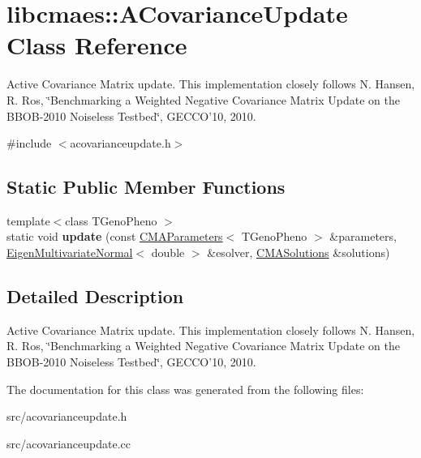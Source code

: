 \hypertarget{classlibcmaes_1_1ACovarianceUpdate}{\section{libcmaes\-:\-:A\-Covariance\-Update Class Reference}
\label{classlibcmaes_1_1ACovarianceUpdate}
}


Active Covariance Matrix update. This implementation closely follows N. Hansen, R. Ros, \char`\"{}\-Benchmarking a Weighted Negative Covariance Matrix 
                           Update on the B\-B\-O\-B-\/2010 Noiseless Testbed\char`\"{}, G\-E\-C\-C\-O'10, 2010.  




{\ttfamily \#include $<$acovarianceupdate.\-h$>$}

\subsection*{Static Public Member Functions}
\begin{DoxyCompactItemize}
\item 
\hypertarget{classlibcmaes_1_1ACovarianceUpdate_a32ad73806788c6d67da8cc908baec6c4}{{\footnotesize template$<$class T\-Geno\-Pheno $>$ }\\static void {\bfseries update} (const \hyperlink{classlibcmaes_1_1CMAParameters}{C\-M\-A\-Parameters}$<$ T\-Geno\-Pheno $>$ \&parameters, \hyperlink{classEigen_1_1EigenMultivariateNormal}{Eigen\-Multivariate\-Normal}$<$ double $>$ \&esolver, \hyperlink{classlibcmaes_1_1CMASolutions}{C\-M\-A\-Solutions} \&solutions)}\label{classlibcmaes_1_1ACovarianceUpdate_a32ad73806788c6d67da8cc908baec6c4}

\end{DoxyCompactItemize}


\subsection{Detailed Description}
Active Covariance Matrix update. This implementation closely follows N. Hansen, R. Ros, \char`\"{}\-Benchmarking a Weighted Negative Covariance Matrix 
                           Update on the B\-B\-O\-B-\/2010 Noiseless Testbed\char`\"{}, G\-E\-C\-C\-O'10, 2010. 

The documentation for this class was generated from the following files\-:\begin{DoxyCompactItemize}
\item 
src/acovarianceupdate.\-h\item 
src/acovarianceupdate.\-cc\end{DoxyCompactItemize}
